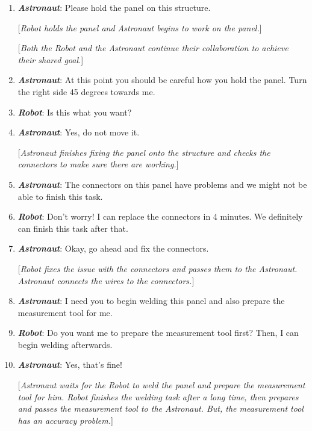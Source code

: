\documentclass[12pt]{report}
\begin{document}
\begin{enumerate}
  \item \textit{\textbf{Astronaut}}: Please hold the panel on this structure. 
  
  [\textit{Robot holds the panel and Astronaut begins to work on the panel.}]

  [\textit{Both the Robot and the Astronaut continue their collaboration to
  achieve their shared goal.}]

  \item \textit{\textbf{Astronaut}}: At this point you should be careful how you hold the
  panel. Turn the right side 45 degrees towards me.

  \item \textit{\textbf{Robot}}: Is this what you want?

  \item \textit{\textbf{Astronaut}}: Yes, do not move it.

  [\textit{Astronaut finishes fixing the panel onto the structure and checks the
  connectors to make sure there are working.}]

  \item \textit{\textbf{Astronaut}}: The connectors on this panel have problems and we
  might not be able to finish this task.

  \item \textit{\textbf{Robot}}: Don't worry! I can replace the connectors in 4 minutes.
  We definitely can finish this task after that.

  \item \textit{\textbf{Astronaut}}: Okay, go ahead and fix the connectors.

  [\textit{Robot fixes the issue with the connectors and passes them to the
  Astronaut. Astronaut connects the wires to the connectors.}]

  \item \textit{\textbf{Astronaut}}: I need you to begin welding this panel and also
  prepare the measurement tool for me.

  \item \textit{\textbf{Robot}}: Do you want me to prepare the measurement tool first?
  Then, I can begin welding afterwards.

  \item \textit{\textbf{Astronaut}}: Yes, that's fine!

  [\textit{Astronaut waits for the Robot to weld the panel and prepare the
  measurement tool for him. Robot finishes the welding task after a long time,
  then prepares and passes the measurement tool to the Astronaut. But, the
  measurement tool has an accuracy problem.}]


\end{enumerate}
\end{document}
